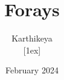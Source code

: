 \title[Title Short]{Forays}
\author[Name]{Karthikeya \texorpdfstring{\\}{and}[1ex]
}
\date[]{February 2024}